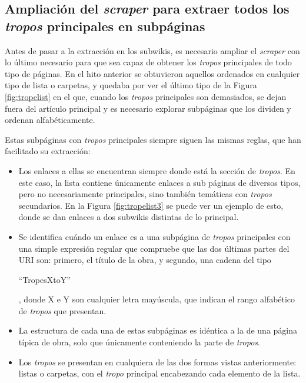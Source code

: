 \subsection{Ampliación del \textit{scraper} para extraer todos los \textit{tropos} principales en subpáginas}
Antes de pasar a la extracción en los subwikis, es necesario ampliar el
\textit{scraper} con lo último necesario para que sea capaz de obtener los
\textit{tropos} principales de todo tipo de páginas. En el hito anterior se
obtuvieron aquellos ordenados en cualquier tipo de lista o carpetas, y quedaba
por ver el último tipo de la Figura \ref{fig:tropelist} en el que, cuando los
\textit{tropos} principales son demasiados, se dejan fuera del artículo
principal y es necesario explorar subpáginas que los dividen y ordenan
alfabéticamente.

Estas subpáginas con \textit{tropos} principales siempre siguen las mismas
reglas, que han facilitado su extracción:
\begin{itemize}
    \item Los enlaces a ellas se encuentran siempre donde está la sección de
    \textit{tropos}. En este caso, la lista contiene únicamente enlaces a sub
    páginas de diversos tipos, pero no necesariamente principales, sino también
    temáticas con \textit{tropos} secundarios. En la Figura \ref{fig:tropelist3}
    se puede ver un ejemplo de esto, donde se dan enlaces a dos subwikis
    distintas de lo principal. 
    \item Se identifica cuándo un enlace es a una subpágina de \textit{tropos}
    principales con una simple expresión regular que compruebe que las dos
    últimas partes del URI son: primero, el título de la obra, y segundo, una
    cadena del tipo
    \begin{otherlanguage}{english}``TropesXtoY''\end{otherlanguage}, donde X e Y
    son cualquier letra mayúscula, que indican el rango alfabético de
    \textit{tropos} que presentan.
    \item La estructura de cada una de estas subpáginas es idéntica a la de una
    página típica de obra, solo que únicamente conteniendo la parte de
    \textit{tropos}.
    \item Los \textit{tropos} se presentan en cualquiera de las dos formas
    vistas anteriormente: listas o carpetas, con el \textit{tropo} principal
    encabezando cada elemento de la lista.
\end{itemize}

